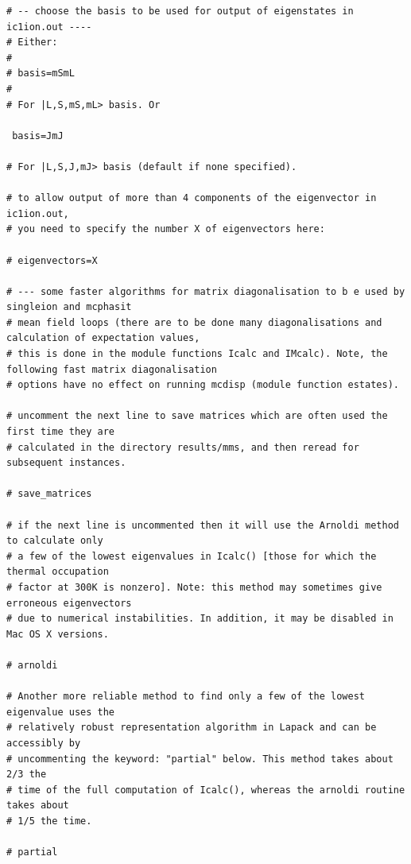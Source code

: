{\begin{verbatim}
# -- choose the basis to be used for output of eigenstates in ic1ion.out ----
# Either:
#
# basis=mSmL
#
# For |L,S,mS,mL> basis. Or
 
 basis=JmJ

# For |L,S,J,mJ> basis (default if none specified).

# to allow output of more than 4 components of the eigenvector in ic1ion.out, 
# you need to specify the number X of eigenvectors here:

# eigenvectors=X

# --- some faster algorithms for matrix diagonalisation to b e used by singleion and mcphasit
# mean field loops (there are to be done many diagonalisations and calculation of expectation values,
# this is done in the module functions Icalc and IMcalc). Note, the following fast matrix diagonalisation
# options have no effect on running mcdisp (module function estates).

# uncomment the next line to save matrices which are often used the first time they are
# calculated in the directory results/mms, and then reread for subsequent instances.

# save_matrices

# if the next line is uncommented then it will use the Arnoldi method to calculate only 
# a few of the lowest eigenvalues in Icalc() [those for which the thermal occupation
# factor at 300K is nonzero]. Note: this method may sometimes give erroneous eigenvectors
# due to numerical instabilities. In addition, it may be disabled in Mac OS X versions.

# arnoldi

# Another more reliable method to find only a few of the lowest eigenvalue uses the 
# relatively robust representation algorithm in Lapack and can be accessibly by 
# uncommenting the keyword: "partial" below. This method takes about 2/3 the
# time of the full computation of Icalc(), whereas the arnoldi routine takes about
# 1/5 the time.

# partial


\end{verbatim}}
